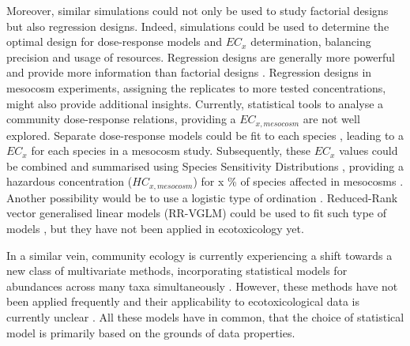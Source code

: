 Moreover, similar simulations could not only be used to study factorial designs but also regression designs.
Indeed, simulations could be used to determine the optimal design for dose-response models and $EC_x$ determination, balancing precision and usage of resources. 
Regression designs are generally more powerful and provide more information than factorial designs  \citep{cottingham_knowing_2005}. 
Regression designs in mesocosm experiments, assigning the replicates to more tested concentrations, might also provide additional insights.
Currently, statistical tools to analyse a community dose-response relations, providing a $EC_{x, mesocosm}$ are not well explored.
Separate dose-response models could be fit to each species \citep{ritz_toward_2010}, leading to a $EC_x$ for each species in a mesocosm study.
Subsequently, these $EC_x$ values could be combined and summarised using Species Sensitivity Distributions \citep{posthuma_species_2002}, providing a 
hazardous concentration ($HC_{x, mesocosm}$) for x \% of species affected in mesocosms \citep{maltby_insecticide_2005}. 
Another possibility would be to use a logistic type of ordination \citep{van_den_brink_multivariate_2003}. 
Reduced-Rank vector generalised linear models (RR-VGLM) could be used to fit such type of models \citep{yee_reduced-rank_2003, yee_vector_2015}, but they have not been applied in ecotoxicology yet.

In a similar vein, community ecology is currently experiencing a shift towards a new class of multivariate methods, incorporating statistical models for abundances across many taxa simultaneously \citep{warton_model-based_2015, warton_distance-based_2012, warton_so_2015, ter_braak_topics_2014}.
However, these methods have not been applied frequently and their applicability to ecotoxicological data is currently unclear \citep{szocs_analysing_2015}. 
All these models have in common, that the choice of statistical model is primarily based on the grounds of data properties. 

